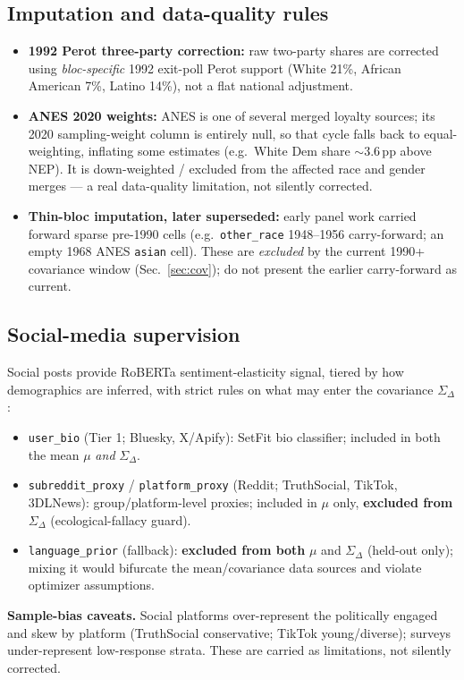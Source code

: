 \documentclass[11pt]{article}
\begin{document}
\subsection{Imputation and data-quality rules}
\begin{itemize}
  \item \textbf{1992 Perot three-party correction:} raw two-party shares are
        corrected using \emph{bloc-specific} 1992 exit-poll Perot support
        (White 21\%, African American 7\%, Latino 14\%), not a flat national
        adjustment.
  \item \textbf{ANES 2020 weights:} ANES is one of several merged loyalty sources;
        its 2020 sampling-weight column is entirely null, so that cycle falls back
        to equal-weighting, inflating some estimates (e.g.\ White Dem share
        $\sim$3.6\,pp above NEP). It is down-weighted / excluded from the affected
        race and gender merges --- a real data-quality limitation, not silently
        corrected.
  \item \textbf{Thin-bloc imputation, later superseded:} early panel work
        carried forward sparse pre-1990 cells (e.g.\ \texttt{other\_race}
        1948--1956 carry-forward; an empty 1968 ANES \texttt{asian} cell). These
        are \emph{excluded} by the current 1990+ covariance window
        (Sec.~\ref{sec:cov}); do not present the earlier carry-forward as
        current.
\end{itemize}

\subsection{Social-media supervision}
Social posts provide RoBERTa sentiment-elasticity signal, tiered by how
demographics are inferred, with strict rules on what may enter the covariance
$\Sigma_\Delta$:
\begin{itemize}
  \item \texttt{user\_bio} (Tier 1; Bluesky, X/Apify): SetFit bio classifier;
        included in both the mean $\mu$ \emph{and} $\Sigma_\Delta$.
  \item \texttt{subreddit\_proxy} / \texttt{platform\_proxy} (Reddit;
        TruthSocial, TikTok, 3DLNews): group/platform-level proxies; included in
        $\mu$ only, \textbf{excluded from} $\Sigma_\Delta$ (ecological-fallacy
        guard).
  \item \texttt{language\_prior} (fallback): \textbf{excluded from both} $\mu$
        and $\Sigma_\Delta$ (held-out only); mixing it would bifurcate the
        mean/covariance data sources and violate optimizer assumptions.
\end{itemize}
\textbf{Sample-bias caveats.} Social platforms over-represent the
politically engaged and skew by platform (TruthSocial conservative; TikTok
young/diverse); surveys under-represent low-response strata. These are carried
as limitations, not silently corrected.
\end{document}
